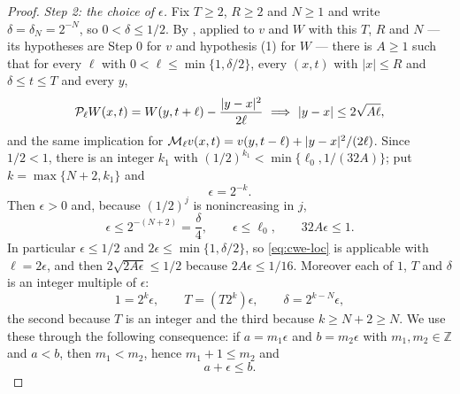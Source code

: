 \begin{proof}
\emph{Step 2: the choice of $\epsilon$.}
Fix $T\ge2$, $R\ge2$ and $N\ge1$ and write $\delta=\delta_N=2^{-N}$, so
$0<\delta\le1/2$. By , applied to $v$ and $W$
with this $T$, $R$ and $N$ --- its hypotheses are Step 0 for $v$ and hypothesis
(1) for $W$ --- there is $A\ge1$ such that for every $\ell$ with
$0<\ell\le\min\{1,\delta/2\}$, every $(x,t)$ with $|x|\le R$ and
$\delta\le t\le T$ and every $y$,
\begin{equation}\label{eq:cwe-loc}
  \mathcal{P}_\ell W(x,t)=W(y,t+\ell)-\frac{|y-x|^2}{2\ell}
    \ \Longrightarrow\ |y-x|\le2\sqrt{A\ell},
\end{equation}
and the same implication for $\mathcal{M}_\ell v(x,t)=v(y,t-\ell)+|y-x|^2/(2\ell)$.
Since $1/2<1$, there is an integer $k_1$ with
$(1/2)^{k_1}<\min\{\ell_0,1/(32A)\}$; put $k=\max\{N+2,k_1\}$ and
\begin{equation}\label{eq:cwe-eps}
  \epsilon=2^{-k}.
\end{equation}
Then $\epsilon>0$ and, because $(1/2)^j$ is nonincreasing in $j$,
\begin{equation}\label{eq:cwe-epsbounds}
  \epsilon\le2^{-(N+2)}=\frac{\delta}{4},\qquad \epsilon\le\ell_0,\qquad
  32A\epsilon\le1 .
\end{equation}
In particular $\epsilon\le1/2$ and $2\epsilon\le\min\{1,\delta/2\}$, so
\eqref{eq:cwe-loc} is applicable with $\ell=2\epsilon$, and then
$2\sqrt{2A\epsilon}\le1/2$ because $2A\epsilon\le1/16$.
Moreover each of $1$, $T$ and $\delta$ is an integer multiple of $\epsilon$:
\begin{equation}\label{eq:cwe-grid}
  1=2^k\epsilon,\qquad T=(T2^k)\epsilon,\qquad \delta=2^{k-N}\epsilon,
\end{equation}
the second because $T$ is an integer and the third because $k\ge N+2\ge N$. We
use these through the following consequence: if $a=m_1\epsilon$ and
$b=m_2\epsilon$ with $m_1,m_2\in\mathbb Z$ and $a<b$, then $m_1<m_2$, hence
$m_1+1\le m_2$ and
\begin{equation}\label{eq:cwe-gap}
  a+\epsilon\le b .
\end{equation}


\end{proof}
